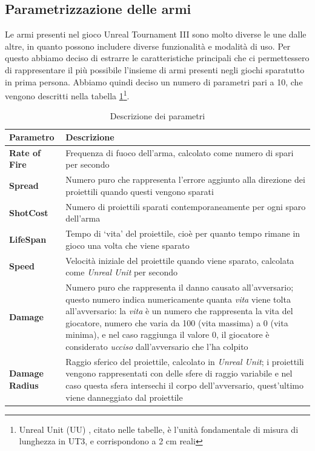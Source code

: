\documentclass[12pt, italian]{toptesi}
\begin{document}
\subsection{Parametrizzazione delle armi}
Le armi presenti nel gioco Unreal Tournament III sono molto diverse le une dalle altre, in quanto possono includere diverse funzionalità e modalità di uso.
Per questo abbiamo deciso di estrarre le caratteristiche principali che ci permettessero di rappresentare il più possibile l'insieme di armi presenti negli giochi sparatutto in prima persona.
Abbiamo quindi deciso un numero di parametri pari a 10, che vengono descritti nella tabella \ref{tab:parametri}\footnote{Unreal Unit (UU) , citato nelle tabelle, è l'unità fondamentale di misura di lunghezza in UT3, e corrispondono a 2 cm reali}.

\begin{table}[htp]
\caption{Descrizione dei parametri}
\label{tab:parametri}
\centering
	 \begin{tabularx}{\textwidth}{lX}
	\toprule
	Parametro & Descrizione \\
	\midrule
	\textbf{Rate of Fire} & Frequenza di fuoco dell'arma, calcolato come numero di spari per secondo \\
	\midrule
	\textbf{Spread} & Numero puro che rappresenta l'errore aggiunto alla direzione dei proiettili quando questi vengono sparati\\
	\midrule
	\textbf{ShotCost} &  Numero di proiettili sparati contemporaneamente per ogni sparo dell'arma\\
	\midrule
	\textbf{LifeSpan} &  Tempo di `vita' del proiettile, cioè per quanto tempo rimane in gioco una volta che viene sparato\\
	\midrule
	\textbf{Speed} &  Velocità iniziale del proiettile quando viene sparato, calcolata come \emph{Unreal Unit} per secondo\\
	\midrule
	\textbf{Damage} &  Numero puro che rappresenta il danno causato all'avversario; questo numero indica numericamente quanta \emph{vita} viene tolta all'avversario: la \emph{vita} è un numero che rappresenta la vita del giocatore,
				    numero che varia da 100 (vita massima) a 0 (vita minima), e nel caso raggiunga il valore 0, il giocatore è considerato \emph{ucciso} dall'avversario che l'ha colpito\\
	\midrule
	\textbf{Damage Radius } & Raggio sferico del proiettile, calcolato in \emph{Unreal Unit}; i proiettili vengono rappresentati con delle sfere di raggio variabile e nel caso questa sfera intersechi il corpo dell'avversario, quest'ultimo viene 					                      danneggiato dal proiettile\\

\end{tabularx}
\end{table}
\end{document}
